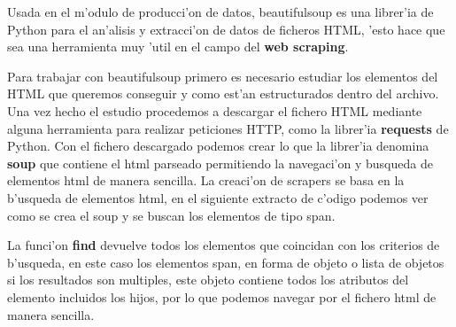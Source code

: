 Usada en el m'odulo de producci'on de datos, beautifulsoup es una librer'ia de Python para el an'alisis y extracci'on de datos de ficheros HTML, 'esto hace que sea una herramienta muy 'util en el campo del \textbf{web scraping}.

Para trabajar con beautifulsoup primero es necesario estudiar los elementos del HTML que queremos conseguir y como est'an estructurados dentro del archivo. Una vez hecho el estudio procedemos a descargar el fichero HTML mediante alguna herramienta para realizar peticiones HTTP, como la librer'ia \textbf{requests} de Python. Con el fichero descargado podemos crear lo que la librer'ia denomina \textbf{soup} que contiene el html parseado permitiendo la navegaci'on y busqueda de elementos html de manera sencilla. 
La creaci'on de scrapers se basa en la b'usqueda de elementos html, en el siguiente extracto de c'odigo podemos ver como se crea el soup y se buscan los elementos de tipo span.


La funci'on \textbf{find} devuelve todos los elementos que coincidan con los criterios de b'usqueda, en este caso los elementos span, en forma de objeto o lista de objetos si los resultados son multiples, este objeto contiene todos los atributos del elemento incluidos los hijos, por lo que podemos navegar por el fichero html de manera sencilla.

\clearpage